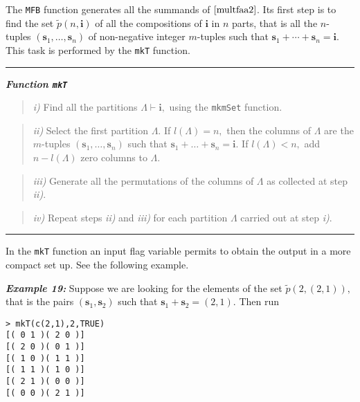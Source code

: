 The \texttt{MFB} function generates all the summands of \(\eqref{multfaa2}\). Its first step is to find the set \(\tilde{p}(n,\boldsymbol{i})\) of all the compositions of \(\boldsymbol{i}\) in \(n\) parts, that is all the \(n\)-tuples
\((\boldsymbol{s}_1,\ldots,\boldsymbol{s}_n)\) of non-negative integer \(m\)-tuples such that \(\boldsymbol{s}_1 + \cdots + \boldsymbol{s}_n = \boldsymbol{i}.\) This task is performed by the \texttt{mkT} function.

\noindent

\rule{13cm}{0.4pt}

\textbf{\emph{Function \texttt{mkT}}}

\begin{quote}
\emph{i)} Find all the partitions \(\Lambda \vdash \boldsymbol{i},\) using the \texttt{mkmSet} function.
\end{quote}

\begin{quote}
\emph{ii)} Select the first partition \(\Lambda.\) If
\(l(\Lambda) = n,\) then the columns of \(\Lambda\) are the \(m\)-tuples \((\boldsymbol{s}_1, \ldots, \boldsymbol{s}_n)\) such that \(\boldsymbol{s}_1 + \ldots + \boldsymbol{s}_n = \boldsymbol{i}.\) If \(l(\Lambda) < n,\) add \(n-l(\Lambda)\) zero columns to \(\Lambda.\)
\end{quote}

\begin{quote}
\emph{iii)} Generate all the permutations of the columns of \(\Lambda\) as collected at step \emph{ii)}.
\end{quote}

\begin{quote}
\emph{iv)} Repeat steps \emph{ii)} and \emph{iii)} for each partition
\(\Lambda\) carried out at step \emph{i)}.
\end{quote}

\noindent

\rule{13cm}{0.4pt}

In the \texttt{mkT} function an input flag variable permits to obtain the output in a more compact set up. See the following example.

\hskip-0.5cm\textbf{\emph{Example 19:}} Suppose we are looking for the elements of the set \(\tilde{p}(2,(2,1)),\)
that is the pairs \((\boldsymbol{s}_1, \boldsymbol{s}_2)\) such that \(\boldsymbol{s}_1 + \boldsymbol{s}_2 = (2,1).\) Then run

\begin{verbatim}
> mkT(c(2,1),2,TRUE)
[( 0 1 )( 2 0 )]
[( 2 0 )( 0 1 )]
[( 1 0 )( 1 1 )]
[( 1 1 )( 1 0 )]
[( 2 1 )( 0 0 )]
[( 0 0 )( 2 1 )]
\end{verbatim}

